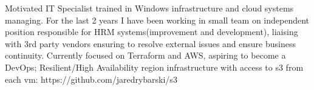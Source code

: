 

\begin{cvparagraph}

Motivated IT Specialist trained in Windows infrastructure and cloud systems managing. For the last 2 years I have been working in small team on independent position responsible for HRM systems(improvement and development), liaising with 3rd party vendors ensuring to resolve external issues and ensure business continuity. Currently focused on Terraform and AWS, aspiring to become a DevOps;
Resilient/High Availability region infrastructure with access to s3 from each vm: https://github.com/jaredrybarski/s3
\end{cvparagraph}
